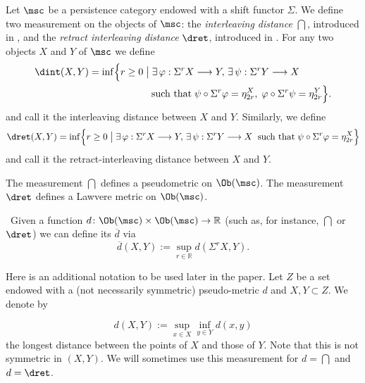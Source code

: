 Let $\msc$ be a persistence category endowed with a shift functor $\Sigma$. We define two measurement on the objects of $\msc$: the \textit{interleaving distance} $\dint$, introduced in \cite{BCZ:tpc}, and the \textit{retract interleaving distance} $\dret$, introduced in \cite{ABC26}. For any two objects $X$ and $Y$ of $\msc$ we define 
\begin{equation} \label{eq:d-int}
  \begin{aligned}
    \dint(X, Y) = \inf \Bigl\{r \geq 0 & \bigm| \exists \, \varphi:
    \Sigma^rX \longrightarrow Y, \, \exists \, \psi: \Sigma^rY
    \longrightarrow X \\
    & \;\;\; \text{such that} \; \psi \circ \Sigma^r \varphi =
    \eta_{2r}^X, \; \varphi \circ \Sigma^r \psi = \eta_{2r}^Y \Bigr\}.
  \end{aligned}
\end{equation}
and call it the interleaving distance between $X$ and $Y$. Similarly, we define 
\begin{equation} \label{eq:d-rint} \dret(X,Y) = \inf \Bigl\{r \geq 0
  \bigm| \exists \, \varphi: \Sigma^rX \longrightarrow Y, \, \exists
  \, \psi: \Sigma^rY
  \longrightarrow X \\
  \;\; \text{such that} \; \psi \circ \Sigma^r \varphi = \eta_{2r}^X
  \Bigr\}
\end{equation}
and call it the retract-interleaving distance between $X$ and $Y$.
\begin{lem}
    The measurement $\dint$ defines a pseudometric on $\Ob(\msc)$. The measurement $\dret$ defines a Lawvere metric on $\Ob(\msc)$.
\end{lem}
\
Given a function $d\colon \Ob(\msc)\times \Ob(\msc)\to \mathbb{R}$ (such as, for instance, $\dint$ or $\dret$) we can define its  $\overline{d}$ via $$\overline{d}(X,Y):= \sup_{r\in \mathbb{R}}d(\Sigma^rX,Y).$$

Here is an additional notation to be used later in the paper. Let $Z$
be a set endowed with a (not necessarily symmetric) pseudo-metric $d$
and $X, Y \subset Z$. We denote by

$$d(X,Y) := \sup_{x \in X} \inf_{y \in Y} d(x,y)$$
the longest distance
between the points of $X$ and those of $Y$. 
Note that this is not symmetric in $(X,Y)$.
We will sometimes use this measurement for $d=\dint$  and $d=\dret$.


